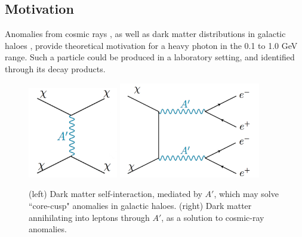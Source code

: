 \documentclass[b1]{sciposter}
\begin{document}
\begin{multicols}{3}
	\section*{Motivation}
Anomalies from cosmic rays
\cite{Finkbeiner:2010sm}, as well as dark matter distributions in galactic haloes \cite{Vogelsberger:2012ku}, provide theoretical motivation for a heavy photon in the 0.1 to 1.0 GeV range.  Such a particle could be produced in a laboratory setting, and identified through its decay products.

\begin{figure}
\begin{center}
\includegraphics[width=0.35\textwidth]{dm_self_interaction}\hspace{1cm}
\includegraphics[width=0.55\textwidth]{dm_coannihilation}

\label{default}
\end{center}
\caption{(left) Dark matter self-interaction, mediated by $A'$, which may solve ``core-cusp" anomalies in galactic haloes.  (right) Dark matter annihilating into leptons through $A'$, as a solution to cosmic-ray anomalies.}
\end{figure}


\end{multicols}
\end{document}

